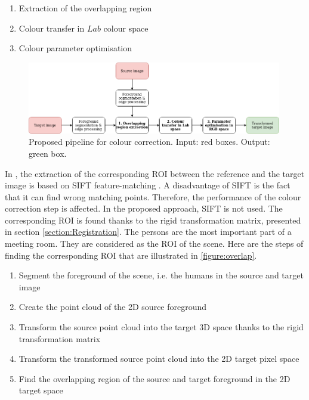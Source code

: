 \begin{enumerate}
\item Extraction of the overlapping region
\item Colour transfer in $Lab$ colour space \cite{reinhard_color_2001}
\item Colour parameter optimisation \cite{dasari_reference_2016}
\end{enumerate}

\begin{figure}[H]
    \centering
    \includegraphics[width=0.99\textwidth]{images/visual_enhancement/colour/colour_correction.png}
    \caption{Proposed pipeline for colour correction. Input: red boxes. Output: green box.}
    \label{figure:colour_correction}
\end{figure}






\label{section:Extraction of the overlapping region}

In \cite{dasari_reference_2016}, the extraction of the corresponding ROI between the reference and the target image is based on SIFT feature-matching \cite{lowe_distinctive_2004}. A disadvantage of SIFT is the fact that it can find wrong matching points. Therefore, the performance of the colour correction step is affected. In the proposed approach, SIFT is not used. The corresponding ROI is found thanks to the rigid transformation matrix, presented in section \ref{section:Registration}. The persons are the most important part of a meeting room. They are considered as the ROI of the scene. Here are the steps of finding the corresponding ROI that are illustrated in \ref{figure:overlap}.

\begin{enumerate}
    \item Segment the foreground of the scene, i.e. the humans in the source and target image
    \item Create the point cloud of the 2D source foreground
    \item Transform the source point cloud into the target 3D space thanks to the rigid transformation matrix
    \item Transform the transformed source point cloud into the 2D target pixel space
    \item Find the overlapping region of the source and target foreground in the 2D target space
\end{enumerate}


